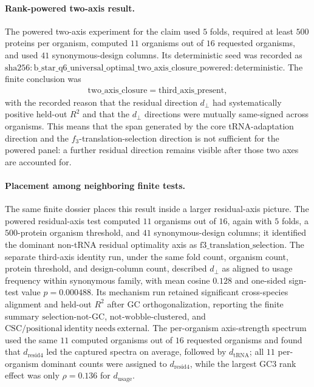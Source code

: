 \paragraph{Rank-powered two-axis result.}
The powered two-axis experiment for the claim used $5$ folds, required at least $500$ proteins per organism, computed $11$ organisms out of $16$ requested organisms, and used $41$ synonymous-design columns.  Its deterministic seed was recorded as $\mathrm{sha256:b\_star\_q6\_universal\_optimal\_two\_axis\_closure\_powered:deterministic}$.  The finite conclusion was
$$
\begin{aligned}
\mathrm{two\_axis\_closure} = \mathrm{third\_axis\_present},
\end{aligned}
$$
with the recorded reason that the residual direction $d_{\perp}$ had systematically positive held-out $R^2$ and that the $d_{\perp}$ directions were mutually same-signed across organisms.  This means that the span generated by the core tRNA-adaptation direction and the $f_3$-translation-selection direction is not sufficient for the powered panel: a further residual direction remains visible after those two axes are accounted for.

\paragraph{Placement among neighboring finite tests.}
The same finite dossier places this result inside a larger residual-axis picture.  The powered residual-axis test computed $11$ organisms out of $16$, again with $5$ folds, a $500$-protein organism threshold, and $41$ synonymous-design columns; it identified the dominant non-tRNA residual optimality axis as $\mathrm{f3\_translation\_selection}$.  The separate third-axis identity run, under the same fold count, organism count, protein threshold, and design-column count, described $d_{\perp}$ as aligned to usage frequency within synonymous family, with mean cosine $0.128$ and one-sided sign-test value $p=0.000488$.  Its mechanism run retained significant cross-species alignment and held-out $R^2$ after GC orthogonalization, reporting the finite summary $\mathrm{selection\mbox{-}not\mbox{-}GC}$, $\mathrm{not\mbox{-}wobble\mbox{-}clustered}$, and $\mathrm{CSC/positional\ identity\ needs\ external}$.  The per-organism axis-strength spectrum used the same $11$ computed organisms out of $16$ requested organisms and found that $d_{\mathrm{resid4}}$ led the captured spectra on average, followed by $d_{\mathrm{tRNA}}$; all $11$ per-organism dominant counts were assigned to $d_{\mathrm{resid4}}$, while the largest GC3 rank effect was only $\rho=0.136$ for $d_{\mathrm{usage}}$.

